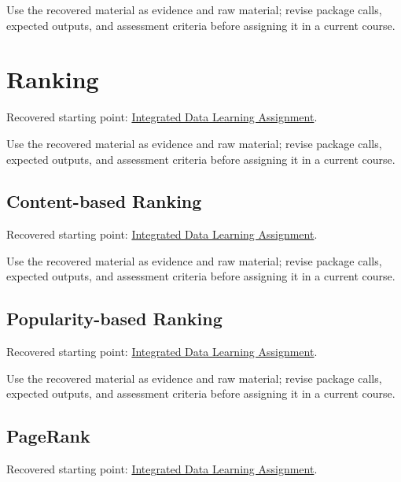 \documentclass[
  letterpaper,
]{scrbook}
\begin{document}
Use the recovered material as evidence and raw material; revise package
calls, expected outputs, and assessment criteria before assigning it in
a current course.

\section*{Ranking}\label{sec-pr-12-ranking}


Recovered starting point:
\hyperref[sec-lab-integrated-learning-assignment]{Integrated Data
Learning Assignment}.

Use the recovered material as evidence and raw material; revise package
calls, expected outputs, and assessment criteria before assigning it in
a current course.

\subsection*{Content-based
Ranking}\label{sec-pr-12-content-based-ranking}

Recovered starting point:
\hyperref[sec-lab-integrated-learning-assignment]{Integrated Data
Learning Assignment}.

Use the recovered material as evidence and raw material; revise package
calls, expected outputs, and assessment criteria before assigning it in
a current course.

\subsection*{Popularity-based
Ranking}\label{sec-pr-12-popularity-based-ranking}

Recovered starting point:
\hyperref[sec-lab-integrated-learning-assignment]{Integrated Data
Learning Assignment}.

Use the recovered material as evidence and raw material; revise package
calls, expected outputs, and assessment criteria before assigning it in
a current course.

\subsection*{PageRank}\label{sec-pr-12-pagerank}

Recovered starting point:
\hyperref[sec-lab-integrated-learning-assignment]{Integrated Data
Learning Assignment}.
\end{document}
